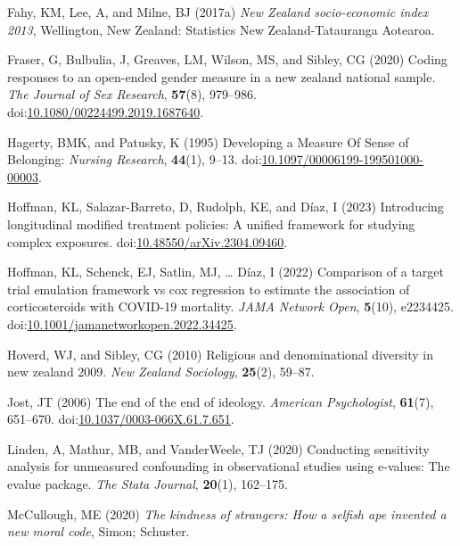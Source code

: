 \documentclass[
  single column]{article}
\newlength{\cslhangindent}
\newenvironment{CSLReferences}[2] %
 {\begin{list}{}{%
  \setlength{\itemindent}{0pt}
  \setlength{\leftmargin}{0pt}
  \setlength{\parsep}{0pt}
  \ifodd #1
   \setlength{\leftmargin}{\cslhangindent}
   \setlength{\itemindent}{-1\cslhangindent}
  \fi
  \setlength{\itemsep}{#2\baselineskip}}}
 {\end{list}}
\begin{document}
\begin{CSLReferences}{1}{0}
Fahy, KM, Lee, A, and Milne, BJ (2017a) \emph{New Zealand socio-economic
index 2013}, Wellington, New Zealand: Statistics New Zealand-Tatauranga
Aotearoa.

Fraser, G, Bulbulia, J, Greaves, LM, Wilson, MS, and Sibley, CG (2020)
Coding responses to an open-ended gender measure in a new zealand
national sample. \emph{The Journal of Sex Research}, \textbf{57}(8),
979--986.
doi:\href{https://doi.org/10.1080/00224499.2019.1687640}{10.1080/00224499.2019.1687640}.

Hagerty, BMK, and Patusky, K (1995) Developing a Measure Of Sense of
Belonging: \emph{Nursing Research}, \textbf{44}(1), 9--13.
doi:\href{https://doi.org/10.1097/00006199-199501000-00003}{10.1097/00006199-199501000-00003}.

Hoffman, KL, Salazar-Barreto, D, Rudolph, KE, and Díaz, I (2023)
Introducing longitudinal modified treatment policies: A unified
framework for studying complex exposures.
doi:\href{https://doi.org/10.48550/arXiv.2304.09460}{10.48550/arXiv.2304.09460}.

Hoffman, KL, Schenck, EJ, Satlin, MJ, \ldots{} Díaz, I (2022) Comparison
of a target trial emulation framework vs cox regression to estimate the
association of corticosteroids with COVID-19 mortality. \emph{JAMA
Network Open}, \textbf{5}(10), e2234425.
doi:\href{https://doi.org/10.1001/jamanetworkopen.2022.34425}{10.1001/jamanetworkopen.2022.34425}.

Hoverd, WJ, and Sibley, CG (2010) Religious and denominational diversity
in new zealand 2009. \emph{New Zealand Sociology}, \textbf{25}(2),
59--87.

Jost, JT (2006) The end of the end of ideology. \emph{American
Psychologist}, \textbf{61}(7), 651--670.
doi:\href{https://doi.org/10.1037/0003-066X.61.7.651}{10.1037/0003-066X.61.7.651}.

Linden, A, Mathur, MB, and VanderWeele, TJ (2020) Conducting sensitivity
analysis for unmeasured confounding in observational studies using
e-values: The evalue package. \emph{The Stata Journal}, \textbf{20}(1),
162--175.

McCullough, ME (2020) \emph{The kindness of strangers: How a selfish ape
invented a new moral code}, Simon; Schuster.


\end{CSLReferences}
\end{document}
